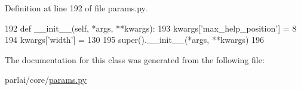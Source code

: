 Definition at line 192 of file params.\+py.


\begin{DoxyCode}
192     \textcolor{keyword}{def }\_\_init\_\_(self, *args, **kwargs):
193         kwargs[\textcolor{stringliteral}{'max\_help\_position'}] = 8
194         kwargs[\textcolor{stringliteral}{'width'}] = 130
195         super().\_\_init\_\_(*args, **kwargs)
196 
\end{DoxyCode}


The documentation for this class was generated from the following file\+:\begin{DoxyCompactItemize}
\item 
parlai/core/\hyperlink{params_8py}{params.\+py}\end{DoxyCompactItemize}
